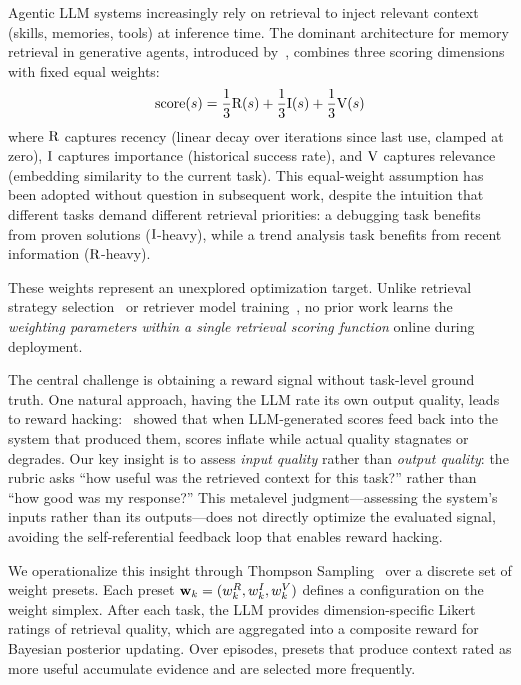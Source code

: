 
Agentic LLM systems increasingly rely on retrieval to inject relevant context (skills, memories, tools) at inference time.
The dominant architecture for memory retrieval in generative agents, introduced by~\citet{park2023generative}, combines three scoring dimensions with fixed equal weights:
\begin{equation}
\text{score}(s) = \frac{1}{3}\text{R}(s) + \frac{1}{3}\text{I}(s) + \frac{1}{3}\text{V}(s)
\label{eq:park_baseline}
\end{equation}
where $\text{R}$ captures recency (linear decay over iterations since last use, clamped at zero), $\text{I}$ captures importance (historical success rate), and $\text{V}$ captures relevance (embedding similarity to the current task).
This equal-weight assumption has been adopted without question in subsequent work, despite the intuition that different tasks demand different retrieval priorities: a debugging task benefits from proven solutions ($\text{I}$-heavy), while a trend analysis task benefits from recent information ($\text{R}$-heavy).

These weights represent an unexplored optimization target.
Unlike retrieval strategy selection~\citep{tang2025mbarag,jeong2024adaptiverag} or retriever model training~\citep{asai2024selfrag}, no prior work learns the \emph{weighting parameters within a single retrieval scoring function} online during deployment.

The central challenge is obtaining a reward signal without task-level ground truth.
One natural approach, having the LLM rate its own output quality, leads to reward hacking:~\citet{pan2024feedback} showed that when LLM-generated scores feed back into the system that produced them, scores inflate while actual quality stagnates or degrades.
Our key insight is to assess \emph{input quality} rather than \emph{output quality}: the rubric asks ``how useful was the retrieved context for this task?'' rather than ``how good was my response?''
This metalevel judgment---assessing the system's inputs rather than its outputs---does not directly optimize the evaluated signal, avoiding the self-referential feedback loop that enables reward hacking.

We operationalize this insight through Thompson Sampling~\citep{thompson1933likelihood,chapelle2011empirical} over a discrete set of weight presets.
Each preset $\mathbf{w}_k = (w_k^R, w_k^I, w_k^V)$ defines a configuration on the weight simplex.
After each task, the LLM provides dimension-specific Likert ratings of retrieval quality, which are aggregated into a composite reward for Bayesian posterior updating.
Over episodes, presets that produce context rated as more useful accumulate evidence and are selected more frequently.

